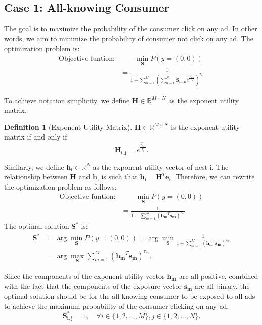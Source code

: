 \documentclass[12pt]{article}
\theoremstyle{definition}
\newtheorem{definition}{Definition}[section]
\newcommand{\matr}[1]{\mathbf{#1}} %
\begin{document}
\begin{sloppypar}
\subsection{Case 1: All-knowing Consumer}
The goal is to maximize the probability of the consumer click on any ad. In other words, we aim to minimize the probability of consumer not click on any ad. The optimization problem is:
\begin{align}
    \text{Objective funtion:} &\qquad \min_{\matr{S}} P(y=(0,0)) \nonumber \\
    &= \frac{1}{1+\sum_{m=1}^{M}(\sum_{n=1}^{N} \matr{S_{m,n}}e^\frac{{V_{m,n}}}{\tau_m})^{\tau_m}}
\end{align}

To achieve notation simplicity, we define $\matr{H} \in \mathbb{R}^{M \times N}$ as the exponent utility matrix.
\begin{definition}[Exponent Utility Matrix]\label{exponent}
    $\matr{H} \in \mathbb{R}^{M \times N}$ is the exponent utility matrix if and only if 
    \begin{equation*}
        \matr{H_{i,j}} = e^\frac{{V_{i,j}}}{\tau_i}.
    \end{equation*}
\end{definition}

Similarly, we define $\matr{h_i} \in \mathbb{R}^{N}$ as the exponent utility vector of nest i. The relationship between $\matr{H}$ and $\matr{h_i}$ is such that $\matr{h_i} = \matr{H}^T \matr{e_i}$.
Therefore, we can rewrite the optimization problem as follows:
\begin{align}
    \text{Objective funtion:} &\qquad \min_{\matr{S}} P(y=(0,0)) \nonumber \\
    &= \frac{1}{1+\sum_{m=1}^{M}(\matr{h_m}^T \matr{s_m})^{\tau_m}}
\end{align}
The optimal solution $\matr{S}^*$ is:
\begin{align}\label{optimal}
    \matr{S}^* &= \arg\min_{\matr{S}} P(y=(0,0)) = \arg\min_{\matr{S}} \frac{1}{1+\sum_{m=1}^{M}(\matr{h_m}^T \matr{s_m})^{\tau_m}} \nonumber \\
    &= \arg\max_{\matr{S}} \sum_{m=1}^{M}(\matr{h_m}^T \matr{s_m})^{\tau_m}.
\end{align}

Since the components of the exponent utility vector $\matr{h_m}$ are all positive, combined with the fact that the components of the exposure vector $\matr{s_m}$ are all binary, the optimal solution should be for the all-knowing consumer to be exposed to all ads to achieve the maximum probability of the consumer clicking on any ad.
\begin{equation}
    \matr{S^*_{i,j}} = 1, \quad \forall i \in \{1,2,...,M\}, j \in \{1,2,...,N\}.
\end{equation}


\end{sloppypar}
\end{document}
